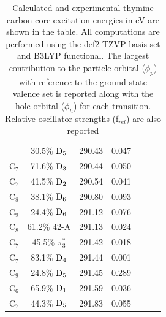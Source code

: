 \documentclass[12pt]{article}
\begin{document}
\begin{table}
\begin{tabular}{c@{\hskip 0.22in}c@{\hskip 0.22in}c@{\hskip 0.22in}c@{\hskip 0.52in}c@{\hskip 0.22in}c@{\hskip 0.22in}c}
 &   30.5$\%$ $\rm D_5$  & 290.43 & 0.047 \\
    C$_7$
 &   71.6$\%$ $\rm D_3$  & 290.44 & 0.050 \\
    C$_7$
 &   41.5$\%$ $\rm D_2$  & 290.54 & 0.041 \\
    C$_8$
 &   38.1$\%$ $\rm D_6$  & 290.80 & 0.093 \\
    C$_9$
 &   24.4$\%$ $\rm D_6$  & 291.12 & 0.076 \\
    C$_8$
 &   61.2$\%$ 42-A  & 291.13 & 0.024 \\
    C$_7$
 &   45.5$\%$ $\pi_3^*$  & 291.42 & 0.018 \\
    C$_7$
 &   83.1$\%$ $\rm D_4$  & 291.44 & 0.001 \\
    C$_9$
 &   24.8$\%$ $\rm D_5$  & 291.45 & 0.289 \\
    C$_6$
 &   65.9$\%$ $\rm D_1$  & 291.59 & 0.036 \\
    C$_7$
 &   44.3$\%$ $\rm D_5$  & 291.83 & 0.055 \\
 \end{tabular}
   \caption{Calculated and experimental thymine carbon core excitation energies in eV are shown in the table. All computations are performed using the def2-TZVP basis set and B3LYP functional. The largest contribution to the particle orbital ($\phi_p$) with reference to the ground state valence set is reported along with the hole orbital ($\phi_h$) for each transition. Relative oscillator strengths (f$_{rel}$) are also reported}
   \label{table: thymine_k_carbon}
 \end{table}
\end{document}
